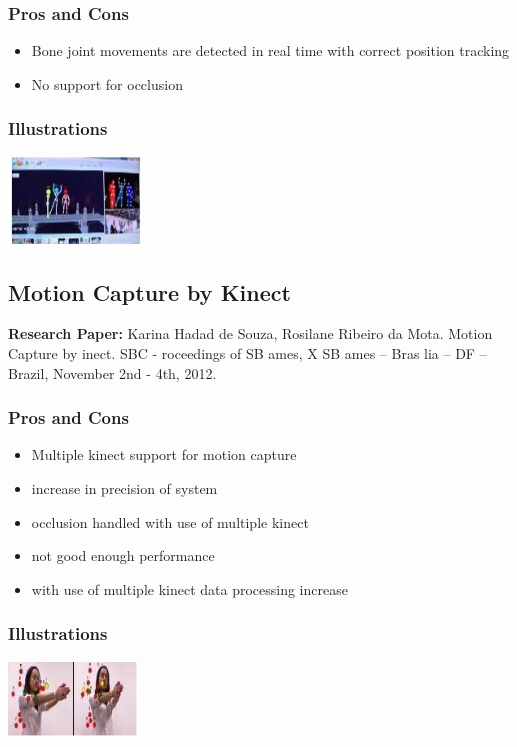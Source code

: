 \documentclass[a4paper,10pt]{report}
\begin{document}
\subsubsection{Pros and Cons}
\begin{itemize}
 \item Bone joint movements are detected in real time with correct position tracking
 \item No support for occlusion
\end{itemize}
\subsubsection{Illustrations}\newline\newline
\includegraphics{./tech8.png}
\newline\newline


\subsection{Motion Capture by Kinect}
\textbf{Research Paper:} Karina Hadad de Souza, Rosilane Ribeiro da Mota. Motion Capture by inect. SBC - roceedings of SB ames, X SB ames – Bras lia – DF – Brazil, November 2nd - 4th, 2012.
\subsubsection{Pros and Cons}
\begin{itemize}
 \item Multiple kinect support for motion capture
 \item increase in precision of system
 \item occlusion handled with use of multiple kinect
 \item not good enough performance
 \item with use of multiple kinect data processing increase
\end{itemize}
\subsubsection{Illustrations}\newline\newline
\includegraphics{./tech9.png}
\newline\newline
\end{document}
